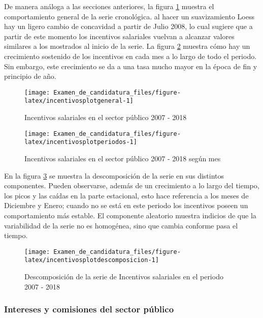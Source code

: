 \documentclass[
]{article}
\begin{document}
De manera análoga a las secciones anteriores, la figura
\ref{fig:incentivosplotgeneral} muestra el comportamiento general de la
serie cronológica. al hacer un suavizamiento Loess hay un ligero cambio
de concavidad a partir de Julio 2008, lo cual sugiere que a partir de
este momento los incentivos salariales vuelvan a alcanzar valores
similares a los mostrados al inicio de la serie. La figura
\ref{fig:incentivosplotperiodos} muestra cómo hay un crecimiento
sostenido de los incentivos en cada mes a lo largo de todo el periodo.
Sin embargo, este crecimiento se da a una tasa mucho mayor en la época
de fin y principio de año.

\begin{figure}[H]
\texttt{[image: Examen\_de\_candidatura\_files/figure-latex/incentivosplotgeneral-1]} \caption{Incentivos salariales en el sector público 2007 - 2018}\label{fig:incentivosplotgeneral}
\end{figure}

\begin{figure}[H]
\texttt{[image: Examen\_de\_candidatura\_files/figure-latex/incentivosplotperiodos-1]} \caption{Incentivos salariales en el sector público 2007 - 2018 según mes}\label{fig:incentivosplotperiodos}
\end{figure}

En la figura \ref{fig:incentivosplotdescomposicion} se muestra la
descomposición de la serie en sus distintos componentes. Pueden
observarse, además de un crecimiento a lo largo del tiempo, los picos y
las caídas en la parte estacional, esto hace referencia a los meses de
Diciembre y Enero; cuando no se está en este periodo los incentivos
poseen un comportamiento más estable. El componente aleatorio muestra
indicios de que la variabilidad de la serie no es homogénea, sino que
cambia conforme pasa el tiempo.

\begin{figure}[H]
\texttt{[image: Examen\_de\_candidatura\_files/figure-latex/incentivosplotdescomposicion-1]} \caption{Descomposición de la serie de Incentivos salariales en el periodo 2007 - 2018}\label{fig:incentivosplotdescomposicion}
\end{figure}

\subsubsection{Intereses y comisiones del sector público}
\end{document}
